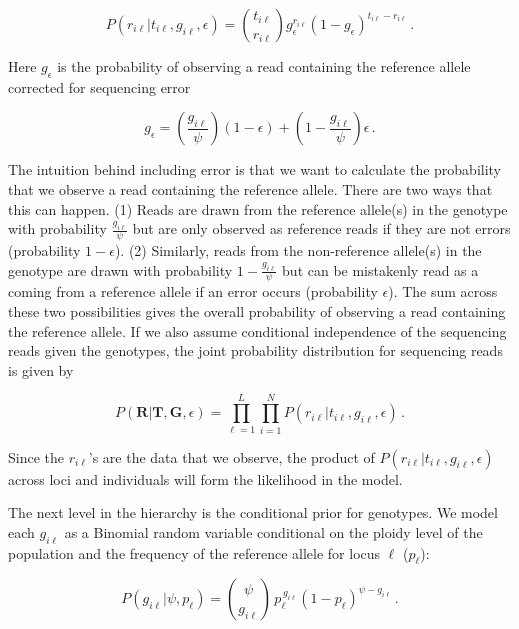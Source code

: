 \documentclass[11pt,english,letterpaper,oneside]{article}
\begin{document}
\begin{equation}\label{likelihood}
P(r_{i \ell}|t_{i\ell}, g_{i \ell},\epsilon) = \binom{t_{i \ell}}{r_{i \ell}} g_\epsilon^{r_{i \ell}}(1-g_\epsilon)^{t_{i \ell}-r_{i \ell}}\,.
\end{equation}

\noindent Here $g_\epsilon$ is the probability of observing a read containing the reference allele corrected for sequencing error

\begin{equation}
	g_\epsilon = \left(\frac{g_{i \ell}}{\psi}\right)(1-\epsilon) + \left(1-\frac{g_{i \ell}}{\psi}\right)\epsilon \,.
\end{equation}

\noindent The intuition behind including error is that we want to calculate the probability that we observe a read containing the reference allele. There are two ways that this can happen. (1) Reads are drawn from the reference allele(s) in the genotype with probability $\frac{g_{i\ell}}{\psi}$ but are only observed as reference reads if they are not errors (probability $1-\epsilon$). (2) Similarly, reads from the non-reference allele(s) in the genotype are drawn with probability $1-\frac{g_{i\ell}}{\psi}$ but can be mistakenly read as a coming from a reference allele if an error occurs (probability $\epsilon$). The sum across these two possibilities gives the overall probability of observing a read containing the reference allele. If we also assume conditional independence of the sequencing reads given the genotypes, the joint probability distribution for sequencing reads is given by

\begin{equation}\label{factored_lik}
P(\bm{R}|\bm{T},\bm{G}, \epsilon) = \displaystyle\prod_{\ell=1}^L\displaystyle\prod_{i=1}^N P(r_{i \ell}|t_{i \ell},g_{i \ell}, \epsilon)\,.
\end{equation}

\noindent Since the $r_{i \ell}$'s are the data that we observe, the product of $P(r_{i \ell}|t_{i\ell}, g_{i \ell},\epsilon)$ across loci and individuals will form the likelihood in the model.
\medskip

The next level in the hierarchy is the conditional prior for genotypes. We model each $g_{i \ell}$ as a Binomial random variable conditional on the ploidy level of the population and the frequency of the reference allele for locus $\ell$ ($p_{\ell}$):

\begin{equation*}
P(g_{i \ell}|\psi,p_{\ell}) = \binom{\psi}{g_{i \ell}}\,p_{\ell}^{\,g_{i \ell}}(1-p_{\ell})^{\psi-g_{i \ell}}\,.
\end{equation*}
\end{document}
